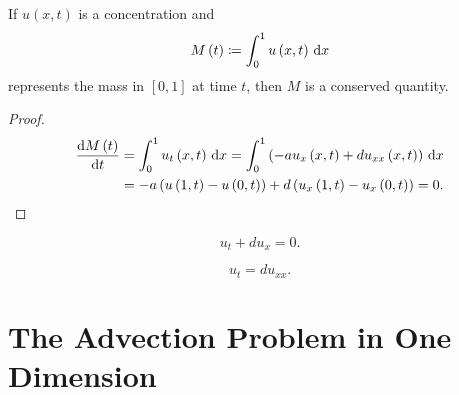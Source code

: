 \begin{frame}

    \begin{theorem}
        If $u\left(x,t\right)$ is a concentration and
        \begin{equation*}
            M\left(t\right)\coloneqq
            \int_{0}^{1}
            u\left(x,t\right)
            \dl x
        \end{equation*}
        represents the mass in $\left[0,1\right]$ at time $t$, then
        $M$ is a conserved quantity.
    \end{theorem}

    \begin{proof}
        \begin{align*}
            \diff{M\left(t\right)}{t} & =
            \int_{0}^{1}
            u_{t}\left(x,t\right)
            \dl x=
            \int_{0}^{1}
            \left(
            -au_{x}\left(x,t\right)+
            du_{xx}\left(x,t\right)
            \right)\dl x                  \\
                                      & =
            -a\left(
            u\left(1,t\right)-
            u\left(0,t\right)
            \right)+
            d\left(
            u_{x}\left(1,t\right)-
            u_{x}\left(0,t\right)
            \right)=0.
        \end{align*}
    \end{proof}
\end{frame}

\begin{frame}
    \begin{definition}
        \begin{equation*}
            u_{t}+du_{x}=0.
        \end{equation*}
    \end{definition}

    \begin{definition}
        \begin{equation*}
            u_{t}=
            du_{xx}.
        \end{equation*}
    \end{definition}
\end{frame}

\section{The Advection Problem in One Dimension}

